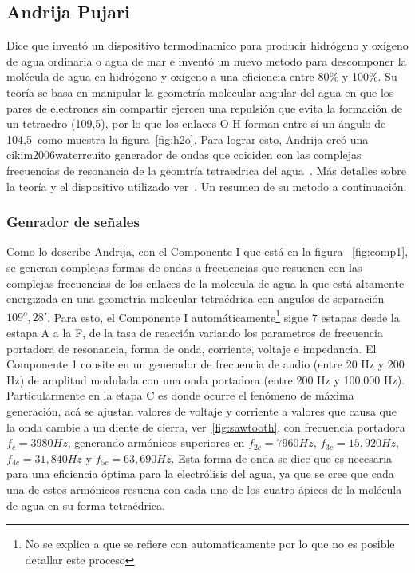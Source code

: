 \documentclass[12pt,twoside,onecolumn]{article}
\begin{document}
\subsection{Andrija Pujari} Dice que inventó un dispositivo termodinamico para producir hidrógeno y oxígeno de agua ordinaria o agua de mar e inventó un nuevo metodo para descomponer la molécula de agua en hidrógeno y oxígeno a una eficiencia entre 80\% y 100\%. Su teoría se basa en manipular la geometría molecular angular del agua en que los pares de electrones sin compartir ejercen una repulsión que evita la formación de un tetraedro (109,5), por lo que los enlaces O-H forman entre sí un ángulo de 104,5~\cite{h2owiki}como muestra la figura~\ref{fig:h2o}. Para lograr esto, Andrija creó una cikim2006waterrcuito generador de ondas que coiciden con las complejas frecuencias de resonancia de la geomtría tetraedrica del agua~\cite{wiki:tetra}. Más detalles sobre la teoría y el dispositivo utilizado ver~\cite{puharich1983method}. Un resumen de su metodo a continuación.

\subsubsection{Genrador de señales}
Como lo describe Andrija, con el Componente I que está en la figura ~\ref{fig:comp1}, se generan  complejas formas de ondas a frecuencias que resuenen con las complejas frecuencias de los enlaces de la molecula de agua la que está altamente energizada en una geometría molecular tetraédrica con angulos de separación $109^o,28'$. Para esto, el Componente I automáticamente\footnote{No se explica a que se refiere con automaticamente por lo que no es posible detallar este proceso} sigue 7 estapas desde la estapa A a la F, de la tasa de reacción variando los parametros de frecuencia portadora de resonancia, forma de onda, corriente, voltaje e impedancia. El Componente 1 consite en un generador de frecuencia de audio (entre 20 Hz y 200 Hz) de amplitud modulada con una onda portadora (entre 200 Hz y 100,000 Hz). Particularmente en la etapa C es donde ocurre el fenómeno de máxima generación, acá se ajustan valores de voltaje y corriente a valores que causa que la onda cambie a un diente de cierra, ver~\ref{fig:sawtooth}, con frecuencia portadora $f_c=3980 Hz$, generando armónicos superiores en $f_{2c}=7960Hz$, $f_{3c}=15,920Hz$, $f_{4c}=31,840Hz$ y $f_{5c}=63,690Hz$. Esta forma de onda se dice que es necesaria para una eficiencia óptima para la electrólisis del agua, ya que se cree que cada una de estos armónicos resuena con cada uno de los cuatro ápices de la molécula de agua en su forma tetraédrica. 
\end{document}
